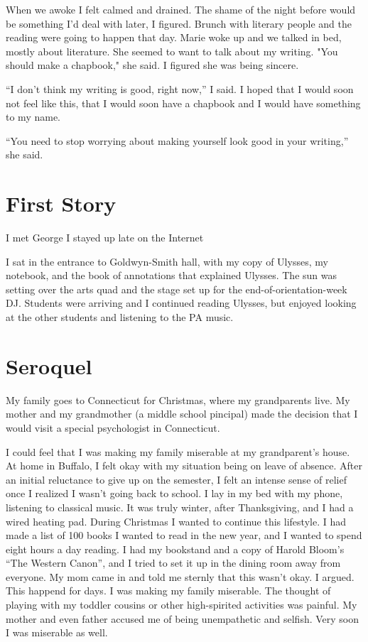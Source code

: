\documentclass[12pt]{article}
\begin{document}
When we awoke I felt calmed and drained.  The shame of the night before would be
something I'd deal with later, I figured.  Brunch with literary people and the
reading were going to happen that day.  Marie woke up and we talked in bed,
mostly about literature.  She seemed to want to talk about my writing.  "You
should make a chapbook," she said.  I figured she was being sincere.  

``I don't think my writing is good, right now,'' I said.  I hoped that I would
soon not feel like this, that I would soon have a chapbook and I would have
something to my name.

``You need to stop worrying about making yourself look good in your writing,'' she
said.

\section{First Story}
I met George
I stayed up late on the Internet

I sat in the entrance to Goldwyn-Smith hall, with my copy of Ulysses, my
notebook, and the book of annotations that explained Ulysses.  The sun was
setting over the arts quad and the stage set up for the end-of-orientation-week
DJ.  Students were arriving and I continued reading Ulysses, but enjoyed
looking at the other students and listening to the PA music.

\section{Seroquel}
My family goes to Connecticut for Christmas, where my grandparents live.  My
mother and my grandmother (a middle school pincipal) made the decision that I
would visit a special psychologist in Connecticut.

I could feel that I was making my family miserable at my grandparent's house.
At home in Buffalo, I felt okay with my situation being on leave of absence.
After an initial reluctance to give up on the semester, I felt an intense sense
of relief once I realized I wasn't going back to school.  I lay in my bed with my
phone, listening to classical music.  It was truly winter, after Thanksgiving,
and I had a wired heating pad.  During Christmas I wanted to continue this
lifestyle.  I had made a list of 100 books I wanted to read in the new year,
and I wanted to spend eight hours a day reading.  I had my bookstand and a copy
of Harold Bloom's ``The Western Canon'', and I tried to set it up in the dining
room away from everyone.  My mom came in and told me sternly that this wasn't
okay.  I argued.  This happend for days.  I was making my family miserable.  The
thought of playing with my toddler cousins or other high-spirited activities was
painful.  My mother and even father accused me of being unempathetic and
selfish.  Very soon I was miserable as well.
\end{document}
